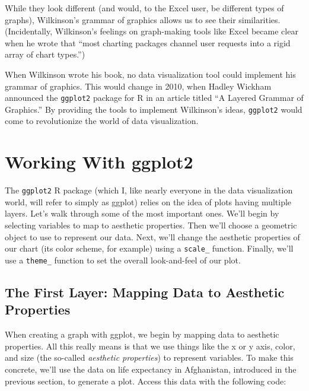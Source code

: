 \documentclass[
]{book}
\begin{document}
While they look different (and would, to the Excel user, be different types of graphs), Wilkinson's grammar of graphics allows us to see their similarities. (Incidentally, Wilkinson's feelings on graph-making tools like Excel became clear when he wrote that ``most charting packages channel user requests into a rigid array of chart types.'')

When Wilkinson wrote his book, no data visualization tool could implement his grammar of graphics. This would change in 2010, when Hadley Wickham announced the \texttt{ggplot2} package for R in an article titled ``A Layered Grammar of Graphics.'' By providing the tools to implement Wilkinson's ideas, \texttt{ggplot2} would come to revolutionize the world of data visualization.

\hypertarget{working-with-ggplot2}{%
\section*{Working With ggplot2}\label{working-with-ggplot2}}

The \texttt{ggplot2} R package (which I, like nearly everyone in the data visualization world, will refer to simply as ggplot) relies on the idea of plots having multiple layers. Let's walk through some of the most important ones. We'll begin by selecting variables to map to aesthetic properties. Then we'll choose a geometric object to use to represent our data. Next, we'll change the aesthetic properties of our chart (its color scheme, for example) using a \texttt{scale\_} function. Finally, we'll use a \texttt{theme\_} function to set the overall look-and-feel of our plot.

\hypertarget{the-first-layer-mapping-data-to-aesthetic-properties}{%
\subsection*{The First Layer: Mapping Data to Aesthetic Properties}\label{the-first-layer-mapping-data-to-aesthetic-properties}}

When creating a graph with ggplot, we begin by mapping data to aesthetic properties. All this really means is that we use things like the x or y axis, color, and size (the so-called \emph{aesthetic properties}) to represent variables. To make this concrete, we'll use the data on life expectancy in Afghanistan, introduced in the previous section, to generate a plot. Access this data with the following code:
\end{document}

